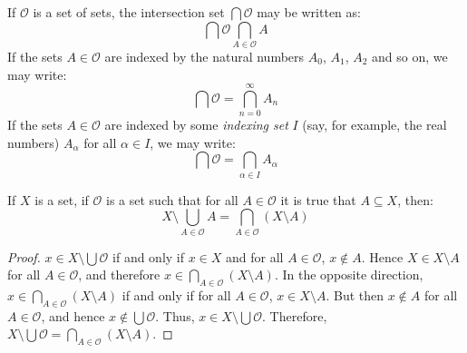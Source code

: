             \begin{notation}
                If $\mathcal{O}$ is a set of sets, the intersection set
                $\bigcap\mathcal{O}$ may be written as:
                \begin{equation}
                    \bigcap\mathcal{O}\bigcap_{A\in\mathcal{O}}A
                \end{equation}
                If the sets $A\in\mathcal{O}$ are indexed by the natural
                numbers $A_{0}$, $A_{1}$, $A_{2}$ and so on, we may write:
                \begin{equation}
                    \bigcap\mathcal{O}=\bigcap_{n=0}^{\infty}A_{n}
                \end{equation}
                If the sets $A\in\mathcal{O}$ are indexed by some
                \textit{indexing set} $I$ (say, for example, the real numbers)
                $A_{\alpha}$ for all $\alpha\in{I}$, we may write:
                \begin{equation}
                    \bigcap\mathcal{O}=\bigcap_{\alpha\in{I}}A_{\alpha}
                \end{equation}
            \end{notation}
            \begin{theorem}
                If $X$ is a set, if $\mathcal{O}$ is a set such that for all
                $A\in\mathcal{O}$ it is true that $A\subseteq{X}$, then:
                \begin{equation}
                    X\setminus\bigcup_{A\in\mathcal{O}}A=
                        \bigcap_{A\in\mathcal{O}}(X\setminus{A})
                \end{equation}
            \end{theorem}
            \begin{proof}
                $x\in{X}\setminus\bigcup\mathcal{O}$ if and only if
                $x\in{X}$ and for all $A\in\mathcal{O}$, $x\notin{A}$. Hence
                $X\in{X}\setminus{A}$ for all $A\in\mathcal{O}$, and therefore
                $x\in\bigcap_{A\in\mathcal{O}}(X\setminus{A})$. In the opposite
                direction, $x\in\bigcap_{A\in\mathcal{O}}(X\setminus{A})$ if
                and only if for all $A\in\mathcal{O}$, $x\in{X}\setminus{A}$.
                But then $x\notin{A}$ for all $A\in\mathcal{O}$, and hence
                $x\notin\bigcup\mathcal{O}$. Thus,
                $x\in{X}\setminus\bigcup\mathcal{O}$. Therefore,
                $X\setminus\bigcup\mathcal{O}=\bigcap_{A\in\mathcal{O}}(X\setminus{A})$.
            \end{proof}
